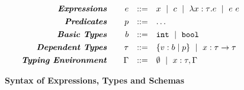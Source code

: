\begin{figure}[t!]
\centering
$$
\begin{array}{rrcl}
\emphbf{Expressions} \quad 
  & e 
  & ::= 
  &      x 
  \spmid c 
  \spmid \efunt{x}{\tau}{e} 
  \spmid \eapp{e}{e} 
  \\[0.05in] 

\emphbf{Predicates} \quad 
  & p
  & ::= 
  & \dots
  \\[0.05in] 

\emphbf{Basic Types} \quad 
  & b 
  & ::= 
  &      \tbint
  \spmid \tbbool
  \\[0.05in]

\emphbf{Dependent Types} \quad 
  & \tau 
  & ::= 
  &      \tref{b}{p} 
  \spmid \tfun{x}{\tau}{\tau}
  \\[0.05in]

\emphbf{Typing Environment} \quad 
  & \Gamma 
  & ::= 
  &      \emptyset 
  \spmid x:\tau, \Gamma

\end{array}
$$
\caption{\textbf{Syntax of Expressions, Types and Schemas}}
\label{fig:syntax}
\end{figure}


